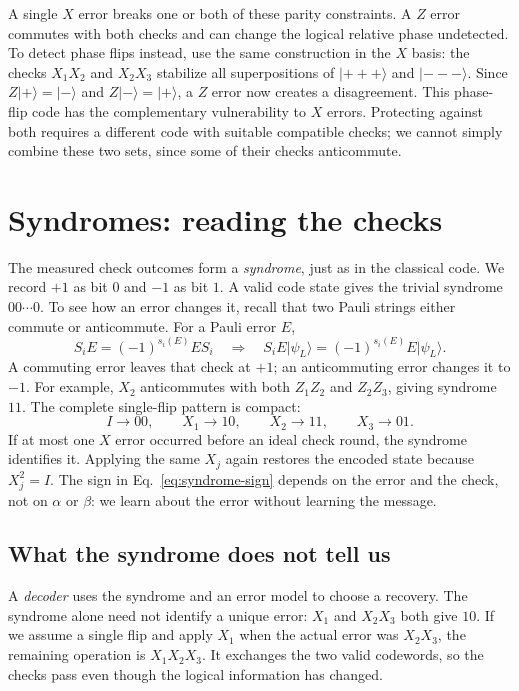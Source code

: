 \documentclass[11pt,a4paper]{article}
\newcommand{\ket}[1]{\lvert #1\rangle}
\begin{document}
A single \(X\) error breaks one or both of these parity constraints. A \(Z\) error commutes with both checks and can change the logical relative phase undetected. To detect phase flips instead, use the same construction in the \(X\) basis: the checks \(X_1X_2\) and \(X_2X_3\) stabilize all superpositions of \(\ket{+++}\) and \(\ket{---}\). Since \(Z\ket+=\ket-\) and \(Z\ket-=\ket+\), a \(Z\) error now creates a disagreement. This phase-flip code has the complementary vulnerability to \(X\) errors. Protecting against both requires a different code with suitable compatible checks; we cannot simply combine these two sets, since some of their checks anticommute.

\newpage
\section{Syndromes: reading the checks}
The measured check outcomes form a \emph{syndrome}, just as in the classical code. We record \(+1\) as bit \(0\) and \(-1\) as bit \(1\). A valid code state gives the trivial syndrome \(00\cdots0\). To see how an error changes it, recall that two Pauli strings either commute or anticommute. For a Pauli error \(E\),
\begin{equation}\label{eq:syndrome-sign}
S_iE=(-1)^{s_i(E)}ES_i
\quad\Longrightarrow\quad
S_iE\ket{\psi_L}=(-1)^{s_i(E)}E\ket{\psi_L}.
\end{equation}
A commuting error leaves that check at \(+1\); an anticommuting error changes it to \(-1\). For example, \(X_2\) anticommutes with both \(Z_1Z_2\) and \(Z_2Z_3\), giving syndrome \(11\). The complete single-flip pattern is compact:
\begin{equation}
I\longrightarrow00,\qquad X_1\longrightarrow10,\qquad
X_2\longrightarrow11,\qquad X_3\longrightarrow01.
\end{equation}
If at most one \(X\) error occurred before an ideal check round, the syndrome identifies it. Applying the same \(X_j\) again restores the encoded state because \(X_j^2=I\). The sign in Eq.~\eqref{eq:syndrome-sign} depends on the error and the check, not on \(\alpha\) or \(\beta\): we learn about the error without learning the message.

\subsection{What the syndrome does not tell us}
A \emph{decoder} uses the syndrome and an error model to choose a recovery. The syndrome alone need not identify a unique error: \(X_1\) and \(X_2X_3\) both give \(10\). If we assume a single flip and apply \(X_1\) when the actual error was \(X_2X_3\), the remaining operation is \(X_1X_2X_3\). It exchanges the two valid codewords, so the checks pass even though the logical information has changed.
\end{document}
